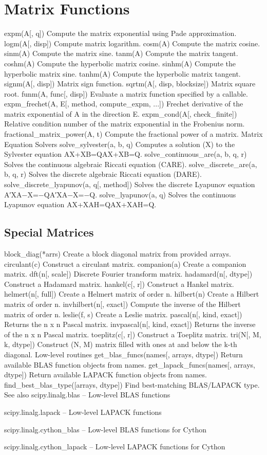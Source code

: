\section{Matrix Functions}
expm(A[, q])	Compute the matrix exponential using Pade approximation.
logm(A[, disp])	Compute matrix logarithm.
cosm(A)	Compute the matrix cosine.
sinm(A)	Compute the matrix sine.
tanm(A)	Compute the matrix tangent.
coshm(A)	Compute the hyperbolic matrix cosine.
sinhm(A)	Compute the hyperbolic matrix sine.
tanhm(A)	Compute the hyperbolic matrix tangent.
signm(A[, disp])	Matrix sign function.
sqrtm(A[, disp, blocksize])	Matrix square root.
funm(A, func[, disp])	Evaluate a matrix function specified by a callable.
expm_frechet(A, E[, method, compute_expm, ...])	Frechet derivative of the matrix exponential of A in the direction E.
expm_cond(A[, check_finite])	Relative condition number of the matrix exponential in the Frobenius norm.
fractional_matrix_power(A, t)	Compute the fractional power of a matrix.
Matrix Equation Solvers
solve_sylvester(a, b, q)	Computes a solution (X) to the Sylvester equation AX+XB=QAX+XB=Q.
solve_continuous_are(a, b, q, r)	Solves the continuous algebraic Riccati equation (CARE).
solve_discrete_are(a, b, q, r)	Solves the discrete algebraic Riccati equation (DARE).
solve_discrete_lyapunov(a, q[, method])	Solves the discrete Lyapunov equation A′XA−X=−QA′XA−X=−Q.
solve_lyapunov(a, q)	Solves the continuous Lyapunov equation AX+XAH=QAX+XAH=Q.

\newpage
\subsection{Special Matrices}
block_diag(*arrs)	Create a block diagonal matrix from provided arrays.
circulant(c)	Construct a circulant matrix.
companion(a)	Create a companion matrix.
dft(n[, scale])	Discrete Fourier transform matrix.
hadamard(n[, dtype])	Construct a Hadamard matrix.
hankel(c[, r])	Construct a Hankel matrix.
helmert(n[, full])	Create a Helmert matrix of order n.
hilbert(n)	Create a Hilbert matrix of order n.
invhilbert(n[, exact])	Compute the inverse of the Hilbert matrix of order n.
leslie(f, s)	Create a Leslie matrix.
pascal(n[, kind, exact])	Returns the n x n Pascal matrix.
invpascal(n[, kind, exact])	Returns the inverse of the n x n Pascal matrix.
toeplitz(c[, r])	Construct a Toeplitz matrix.
tri(N[, M, k, dtype])	Construct (N, M) matrix filled with ones at and below the k-th diagonal.
Low-level routines
get_blas_funcs(names[, arrays, dtype])	Return available BLAS function objects from names.
get_lapack_funcs(names[, arrays, dtype])	Return available LAPACK function objects from names.
find_best_blas_type([arrays, dtype])	Find best-matching BLAS/LAPACK type.
See also
scipy.linalg.blas – Low-level BLAS functions

scipy.linalg.lapack – Low-level LAPACK functions

scipy.linalg.cython_blas – Low-level BLAS functions for Cython

scipy.linalg.cython_lapack – Low-level LAPACK functions for Cython
